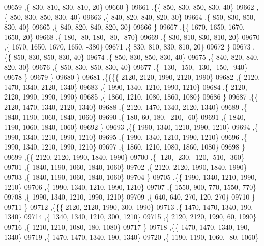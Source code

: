 \begin{DoxyCode}
09659     ,\{   830,   810,   830,   810,    20\}
09660     \}
09661    ,\{\{   850,   830,   850,   830,    40\}
09662     ,\{   850,   830,   850,   830,    40\}
09663     ,\{   840,   820,   840,   820,    30\}
09664     ,\{   850,   830,   850,   830,    40\}
09665     ,\{   840,   820,   840,   820,    30\}
09666     \}
09667    ,\{\{  1670,  1650,  1670,  1650,    20\}
09668     ,\{   180,   -80,   180,   -80,  -870\}
09669     ,\{   830,   810,   830,   810,    20\}
09670     ,\{  1670,  1650,  1670,  1650,  -380\}
09671     ,\{   830,   810,   830,   810,    20\}
09672     \}
09673    ,\{\{   850,   830,   850,   830,    40\}
09674     ,\{   850,   830,   850,   830,    40\}
09675     ,\{   840,   820,   840,   820,    30\}
09676     ,\{   850,   830,   850,   830,    40\}
09677     ,\{  -130,  -150,  -130,  -150,  -940\}
09678     \}
09679    \}
09680   \}
09681  ,\{\{\{\{  2120,  2120,  1990,  2120,  1990\}
09682     ,\{  2120,  1470,  1340,  2120,  1340\}
09683     ,\{  1990,  1340,  1210,  1990,  1210\}
09684     ,\{  2120,  2120,  1990,  1990,  1990\}
09685     ,\{  1860,  1210,  1080,  1860,  1080\}
09686     \}
09687    ,\{\{  2120,  1470,  1340,  2120,  1340\}
09688     ,\{  2120,  1470,  1340,  2120,  1340\}
09689     ,\{  1840,  1190,  1060,  1840,  1060\}
09690     ,\{   180,    60,   180,  -210,   -60\}
09691     ,\{  1840,  1190,  1060,  1840,  1060\}
09692     \}
09693    ,\{\{  1990,  1340,  1210,  1990,  1210\}
09694     ,\{  1990,  1340,  1210,  1990,  1210\}
09695     ,\{  1990,  1340,  1210,  1990,  1210\}
09696     ,\{  1990,  1340,  1210,  1990,  1210\}
09697     ,\{  1860,  1210,  1080,  1860,  1080\}
09698     \}
09699    ,\{\{  2120,  2120,  1990,  1840,  1990\}
09700     ,\{  -120,  -230,  -120,  -510,  -360\}
09701     ,\{  1840,  1190,  1060,  1840,  1060\}
09702     ,\{  2120,  2120,  1990,  1840,  1990\}
09703     ,\{  1840,  1190,  1060,  1840,  1060\}
09704     \}
09705    ,\{\{  1990,  1340,  1210,  1990,  1210\}
09706     ,\{  1990,  1340,  1210,  1990,  1210\}
09707     ,\{  1550,   900,   770,  1550,   770\}
09708     ,\{  1990,  1340,  1210,  1990,  1210\}
09709     ,\{   640,   640,   270,   120,   270\}
09710     \}
09711    \}
09712   ,\{\{\{  2120,  2120,  1990,   300,  1990\}
09713     ,\{  1470,  1470,  1340,   190,  1340\}
09714     ,\{  1340,  1340,  1210,   300,  1210\}
09715     ,\{  2120,  2120,  1990,    60,  1990\}
09716     ,\{  1210,  1210,  1080,   180,  1080\}
09717     \}
09718    ,\{\{  1470,  1470,  1340,   190,  1340\}
09719     ,\{  1470,  1470,  1340,   190,  1340\}
09720     ,\{  1190,  1190,  1060,   -80,  1060\}

\end{DoxyCode}
